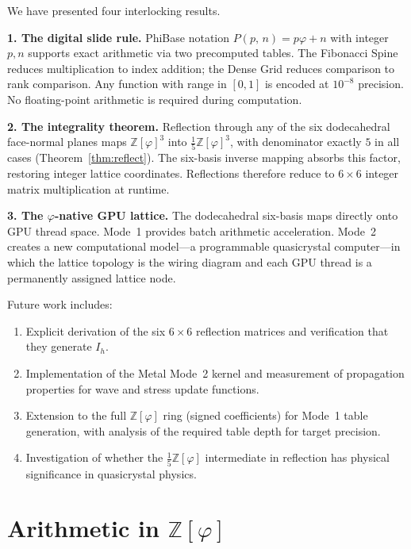 \documentclass[12pt]{article}
\theoremstyle{definition}
\theoremstyle{remark}
\newcommand{\Zphi}{\mathbb{Z}[\varphi]}
\newcommand{\Phib}[2]{P(#1,\,#2)}
\begin{document}
We have presented four interlocking results.

\medskip
\noindent\textbf{1. The digital slide rule.}
PhiBase notation $\Phib{p}{n} = p\varphi + n$ with integer $p,n$
supports exact arithmetic via two precomputed tables.  The Fibonacci
Spine reduces multiplication to index addition; the Dense Grid reduces
comparison to rank comparison.  Any function with range in $[0,1]$
is encoded at $10^{-8}$ precision.  No floating-point arithmetic is
required during computation.

\medskip
\noindent\textbf{2. The integrality theorem.}
Reflection through any of the six dodecahedral face-normal planes maps
$\Zphi^3$ into $\tfrac{1}{5}\Zphi^3$, with denominator exactly $5$
in all cases (Theorem~\ref{thm:reflect}).  The six-basis inverse mapping
absorbs this factor, restoring integer lattice coordinates.  Reflections
therefore reduce to $6\times 6$ integer matrix multiplication at runtime.

\medskip
\noindent\textbf{3. The $\varphi$-native GPU lattice.}
The dodecahedral six-basis maps directly onto GPU thread space.
Mode~1 provides batch arithmetic acceleration.  Mode~2 creates a
new computational model---a programmable quasicrystal computer---in
which the lattice topology is the wiring diagram and each GPU thread
is a permanently assigned lattice node.

\medskip
Future work includes:

\begin{enumerate}[leftmargin=*]
\item Explicit derivation of the six $6\times 6$ reflection matrices
      and verification that they generate $I_h$.
\item Implementation of the Metal Mode~2 kernel and measurement of
      propagation properties for wave and stress update functions.
\item Extension to the full $\Zphi$ ring (signed coefficients) for
      Mode~1 table generation, with analysis of the required table
      depth for target precision.
\item Investigation of whether the $\tfrac{1}{5}\Zphi$ intermediate
      in reflection has physical significance in quasicrystal physics.
\end{enumerate}

\appendix
\section{Arithmetic in $\mathbb{Z}[\varphi]$}
\end{document}
